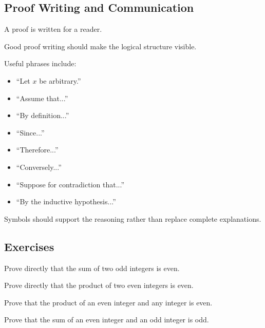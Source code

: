 \subsection{Proof Writing and Communication}
\label{subsec:proof-writing-communication}

A proof is written for a reader.

Good proof writing should make the logical structure visible.

Useful phrases include:

\begin{itemize}
    \item ``Let \(x\) be arbitrary.''
    \item ``Assume that...''
    \item ``By definition...''
    \item ``Since...''
    \item ``Therefore...''
    \item ``Conversely...''
    \item ``Suppose for contradiction that...''
    \item ``By the inductive hypothesis...''
\end{itemize}

Symbols should support the reasoning rather than replace complete explanations.

\subsection{Exercises}
\label{subsec:proof-exercises}

\begin{exercise}[1]
Prove directly that the sum of two odd integers is even.
\end{exercise}

\begin{exercise}[1]
Prove directly that the product of two even integers is even.
\end{exercise}

\begin{exercise}[1]
Prove that the product of an even integer and any integer is even.
\end{exercise}

\begin{exercise}[2]
Prove that the sum of an even integer and an odd integer is odd.
\end{exercise}

